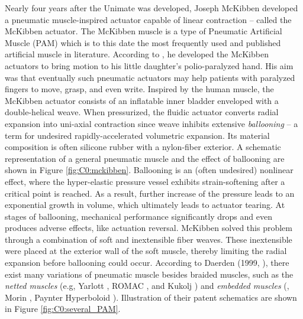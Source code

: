 Nearly four years after the Unimate was developed, Joseph McKibben developed a pneumatic muscle-inspired actuator capable of linear contraction -- called the McKibben actuator. The McKibben muscle is a type of Pneumatic Artificial Muscle (PAM) which is to this date the most frequently used and published artificial muscle in literature. According to \cite{Mckibben}, he developed the McKibben actuators to bring motion to his little daughter's polio-paralyzed hand. His aim was that eventually such pneumatic actuators may help patients with paralyzed fingers to move, grasp, and even write. Inspired by the human muscle, the McKibben actuator consists of an inflatable inner bladder enveloped with a double-helical weave. When pressurized, the fluidic actuator converts radial expansion into uni-axial contraction \cite{Daerden1999,Daerden2000,Schulte1961} since weave inhibits extensive \emph{ballooning} -- a term for undesired rapidly-accelerated volumetric expansion. Its material composition is often silicone rubber with a nylon-fiber exterior. A schematic representation of a general pneumatic muscle and the effect of ballooning are shown in Figure \ref{fig:C0:mckibben}. Ballooning is an (often undesired) nonlinear effect, where the hyper-elastic pressure vessel exhibits strain-softening after a critical point is reached. As a result, further increase of the pressure leads to an exponential growth in volume, which ultimately leads to actuator tearing. At stages of ballooning, mechanical performance significantly drops and even produces adverse effects, like actuation reversal. McKibben solved this problem through a combination of soft and inextensible fiber weaves. These inextensible were placed at the exterior wall of the soft muscle, thereby limiting the radial expansion before ballooning could occur. According to Daerden (1999, \cite{Daerden1999}), there exist many variations of pneumatic muscle besides braided muscles, such as the \emph{netted muscles} (e.g, Yarlott \cite{Yarlott1972}, ROMAC \cite{Immega1986}, and Kukolj \cite{Kukolj1988}) and \emph{embedded muscles} (\eg, Morin \cite{Morin1953}, Paynter Hyperboloid \cite{Paynter1988}). Illustration of their patent schematics are shown in Figure \ref{fig:C0:several_PAM}.


